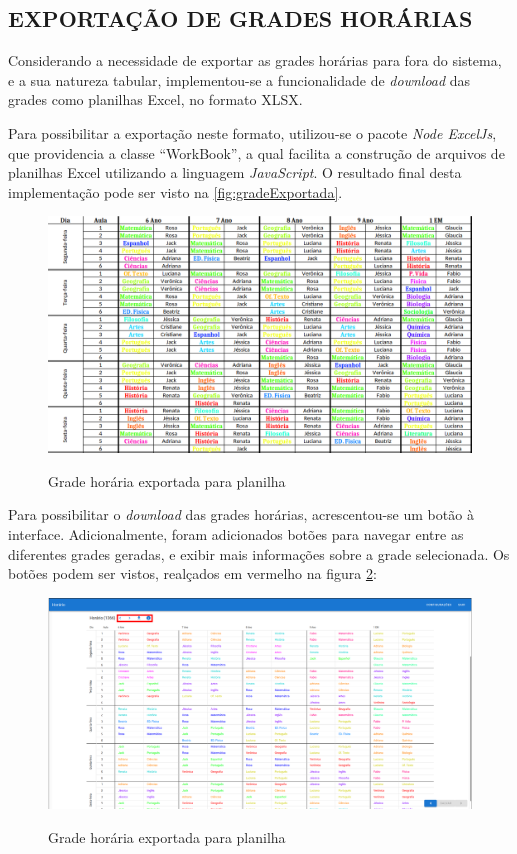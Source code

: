 \subsection{EXPORTAÇÃO DE GRADES HORÁRIAS}

Considerando a necessidade de exportar as grades horárias para fora do sistema, e a sua natureza tabular, implementou-se a funcionalidade de \textit{download} das grades como planilhas Excel, no formato XLSX.

Para possibilitar a exportação neste formato, utilizou-se o pacote \textit{Node ExcelJs}, que providencia a classe ``WorkBook'', a qual facilita a construção de arquivos de planilhas Excel utilizando a linguagem \textit{JavaScript}. O resultado final desta implementação pode ser visto na \autoref{fig:gradeExportada}.

\begin{figure}[!htb]
	\centering
	\caption{Grade horária exportada para planilha}
	\includegraphics[width=1\textwidth]{./dados/figuras/gradeExportada}
	\label{fig:gradeExportada}
\end{figure}

Para possibilitar o \textit{download} das grades horárias, acrescentou-se um botão à interface. Adicionalmente, foram adicionados botões para navegar entre as diferentes grades geradas, e exibir mais informações sobre a grade selecionada. Os botões podem ser vistos, realçados em vermelho na figura \ref{fig:botoes}:

\begin{figure}[!htb]
	\centering
	\caption{Grade horária exportada para planilha}
	\includegraphics[width=1\textwidth]{./dados/figuras/botoes_grade}
	\label{fig:botoes}
\end{figure}
\pagebreak

